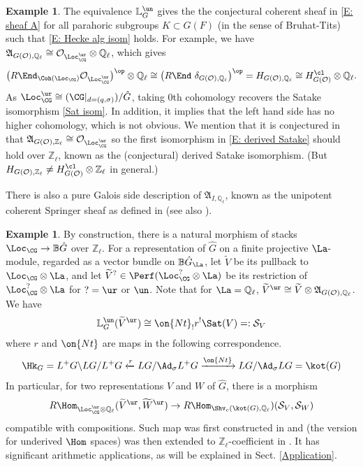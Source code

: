 \documentclass[11pt]{amsart}
\theoremstyle{definition}
\theoremstyle{definition}
\newtheorem{ex}[thm]{Example}
\theoremstyle{definition}
\numberwithin{equation}{section}
\newcommand{\frakA}{{\mathfrak A}}
\newcommand{\bB}{{\mathbb B}}
\newcommand{\bL}{{\mathbb L}}
\newcommand{\bQ}{{\mathbb Q}}
\newcommand{\bZ}{{\mathbb Z}}
\newcommand{\mO}{{\mathcal O}}
\newcommand{\mS}{{\mathcal S}}
\begin{document}
\begin{ex}
The equivalence $\bL_G^{\un}$ gives the the conjectural coherent sheaf in \eqref{E: sheaf A} for all parahoric subgroups $K\subset G(F)$ (in the sense of Bruhat-Tits) such that \eqref{E: Hecke alg isom} holds. For example, we have $\frakA_{G(\mO),\bQ_\ell}\cong \mO_{\Loc_{\CG}^{\ur}}\otimes\bQ_\ell$, which gives
\begin{equation}\label{E: derived Satake}
\big(R\End_{\Coh(\Loc_{\CG})}\mO_{\Loc_{\CG}^{\ur}}\big)^{\op}\otimes\bQ_\ell\cong \big(R\End\ \delta_{G(\mO),\bQ_\ell}\big)^{\op}= H_{G(\mO),\bQ_\ell}\cong H_{G(\mO)}^{\cl}\otimes\bQ_\ell.
\end{equation} 
As $\Loc_{\CG}^{\ur}\cong (\CG|_{d=(q,\sigma)})/\hat{G}$,
taking $0$th cohomology recovers the Satake isomorphism \eqref{Sat isom}. 
In addition, it implies that the left hand side has no higher cohomology, which is not obvious.  We mention that it is conjectured in \cite[Sect. 4.3]{Zhu-Conjecture} that $\frakA_{G(\mO),\bZ_\ell}\cong \mO_{\Loc_{\CG}^{\ur}}$ so the first isomorphism in \eqref{E: derived Satake} should hold over $\bZ_\ell$, known as the (conjectural) derived Satake isomorphism. (But $H_{G(\mO),\bZ_\ell}\neq H_{G(\mO)}^{\cl}\otimes\bZ_\ell$ in general.)

There is also a pure Galois side description of $\frakA_{I,\bQ_\ell}$, known as the unipotent coherent Springer sheaf as defined in \cite{BCHN, Zhu-Conjecture} (see also \cite{Hellmann-Iwahori}).
\end{ex}

\begin{ex}\label{Ex: trace of Satake}
By construction, there is a natural morphism of stacks $\Loc_{\CG}\to \bB\hat{G}$ over $\bZ_\ell$. For a representation of $\hat{G}$ on a finite projective $\La$-module, regarded as a vector bundle on $\bB\hat{G}_\La$, let $\widetilde V$ be its pullback to $\Loc_{\CG}\otimes\La$, and let $\widetilde{V}^{?}\in \Perf(\Loc_{\CG}^{?}\otimes\La)$ be its restriction of $\Loc_{\CG}^?\otimes\La$ for $?=\ur$ or $\un$. 
Note that for $\La=\bQ_\ell$, $\widetilde{V}^{\ur}\cong \widetilde{V}\otimes \frakA_{G(\mO),\bQ_\ell}$. We have
\[
\bL_G^{\un}(\widetilde{V}^{\ur})\cong \on{Nt}_!r^!\Sat(V)=:\mS_V
\]
where $r$ and $\on{Nt}$ are maps in the following correspondence.
\[
\Hk_G=L^+G\backslash LG/L^+G\xleftarrow{r} LG/\Ad_\sigma L^+G\xrightarrow{\on{Nt}} LG/\Ad_\sigma LG=\kot(G)
\]
In particular, for two representations $V$ and $W$ of $\hat{G}$, there is a morphism
\begin{equation}\label{E: local S-operator}
R\Hom_{\Loc_{\CG}^{\ur}\otimes\bQ_\ell}(\widetilde{V}^{\ur}, \widetilde{W}^{\ur})\to R\Hom_{\Shv_c(\kot(G),\bQ_\ell})(\mS_V,\mS_W)
\end{equation}
compatible with compositions. Such map was first constructed in \cite{Xiao-Zhu-Cycle,Zhu-CDM} and (the version for underived $\Hom$ spaces) was then extended to $\bZ_\ell$-coefficient in \cite{Yu-Jacquet-Langlands-Higher-Weights}. It has significant arithmetic applications, as will be explained in Sect. \ref{Application}. 
\end{ex}
\end{document}
